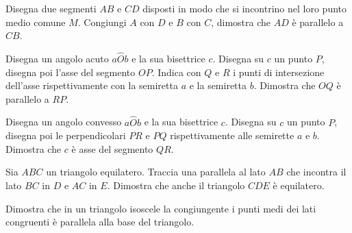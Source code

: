 \begin{multicols}{2}
\begin{esercizio}
\label{ese:3.42}
Disegna due segmenti $AB$ e $CD$ disposti in modo che si incontrino 
nel loro punto medio comune $M$. Congiungi $A$ con $D$ e $B$ con $C$, 
dimostra che $AD$ è parallelo a $CB$.
\end{esercizio}

\begin{esercizio}
\label{ese:3.43}
Disegna un angolo acuto $a\widehat{O}b$ e la sua bisettrice $c$. 
Disegna su $c$ un punto $P$, disegna poi l'asse del segmento $OP$. 
Indica con $Q$ e $R$ i punti di intersezione dell'asse 
rispettivamente con la semiretta $a$ e la semiretta $b$. Dimostra che 
$OQ$ è parallelo a $RP$.
\end{esercizio}

\begin{esercizio}
\label{ese:3.44}
Disegna un angolo convesso $a\widehat{O}b$ e la sua bisettrice $c$. 
Disegna su $c$ un punto $P$, disegna poi le perpendicolari $PR$ e 
$PQ$ rispettivamente alle semirette $a$ e $b$. Dimostra che $c$ è asse 
del segmento $QR$.
\end{esercizio}

\begin{esercizio}
\label{ese:3.45}
Sia $ABC$ un triangolo equilatero. Traccia una parallela al lato $AB$ 
che incontra il lato $BC$ in $D$ e $AC$ in $E$. Dimostra che anche il 
triangolo $CDE$ è equilatero.
\end{esercizio}

\begin{esercizio}
	\label{ese:3.66}
	Dimostra che in un triangolo isoscele la congiungente i punti medi 
	dei lati congruenti è parallela alla base del triangolo.
\end{esercizio}

\end{multicols}


\subsubsection*{}

